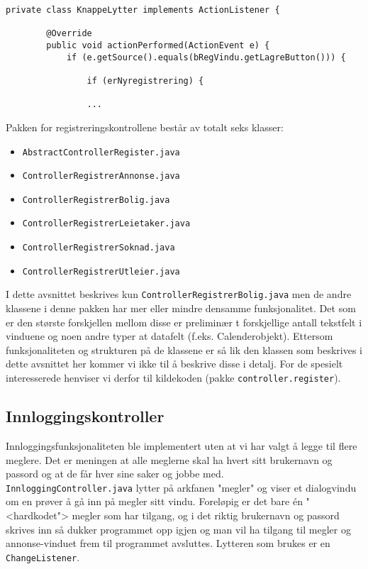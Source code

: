 \begin{lstlisting}[caption=\texttt{ControllerRegistrerBolig.java}: Uttdrag fra privat lytterklasse i kontrolleren.,label=kode:regex_bolig3]
    private class KnappeLytter implements ActionListener {

        @Override
        public void actionPerformed(ActionEvent e) {
            if (e.getSource().equals(bRegVindu.getLagreButton())) {

                if (erNyregistrering) {
                
                ...
\end{lstlisting}


Pakken for registreringskontrollene består av totalt seks klasser:
\begin{itemize}[noitemsep,nolistsep]
\item \texttt{AbstractControllerRegister.java}
\item \texttt{ControllerRegistrerAnnonse.java}
\item \texttt{ControllerRegistrerBolig.java}
\item \texttt{ControllerRegistrerLeietaker.java}
\item \texttt{ControllerRegistrerSoknad.java}
\item \texttt{ControllerRegistrerUtleier.java}
\end{itemize}

I dette avsnittet beskrives kun \texttt{ControllerRegistrerBolig.java} men de andre klassene i denne pakken har mer eller mindre densamme funksjonalitet. Det som er den største forskjellen mellom disse er preliminær t forskjellige antall tekstfelt i vinduene og noen andre typer at datafelt (f.eks. Calenderobjekt). Ettersom funksjonaliteten og strukturen på de klassene er så lik den klassen som beskrives i dette avsnittet her kommer vi ikke til å beskrive disse i detalj. For de spesielt interesserede henviser vi derfor til kildekoden (pakke \texttt{controller.register}).



\subsection{Innloggingskontroller}
Innloggingsfunksjonaliteten ble implementert uten at vi har valgt å legge til flere meglere. Det er meningen at alle meglerne skal ha hvert sitt brukernavn og passord og at de får hver sine saker og jobbe med. \\
\texttt{InnloggingController.java} lytter på arkfanen "megler" og viser et dialogvindu om en prøver å gå inn på megler sitt vindu. Foreløpig er det bare én "<hardkodet"> megler som har tilgang, og i det riktig brukernavn og passord skrives inn så dukker programmet opp igjen og man vil ha tilgang til megler og annonse-vinduet frem til programmet avsluttes. Lytteren som brukes er en \texttt{ChangeListener}.

